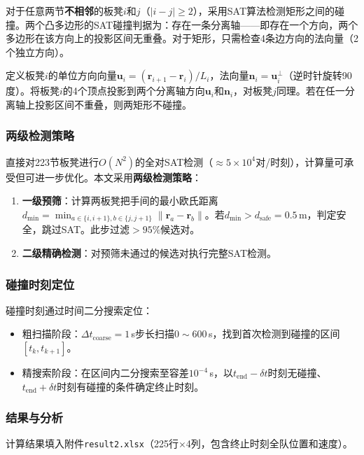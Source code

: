 \documentclass[12pt]{ctexart}
\begin{document}
对于任意两节\textbf{不相邻}的板凳$i$和$j$（$|i-j|\ge 2$），采用SAT算法检测矩形之间的碰撞。两个凸多边形的SAT碰撞判据为：存在一条分离轴——即存在一个方向，两个多边形在该方向上的投影区间无重叠。对于矩形，只需检查4条边方向的法向量（2个独立方向）。

定义板凳$i$的单位方向向量$\bm{u}_i = (\bm{r}_{i+1}-\bm{r}_i)/L_i$，法向量$\bm{n}_i = \bm{u}_i^\perp$（逆时针旋转90度）。将板凳$i$的4个顶点投影到两个分离轴方向$\bm{u}_i$和$\bm{n}_i$，对板凳$j$同理。若在任一分离轴上投影区间不重叠，则两矩形不碰撞。

\subsubsection{两级检测策略}

直接对223节板凳进行$O(N^2)$的全对SAT检测（$\approx 5\times 10^4$对/时刻），计算量可承受但可进一步优化。本文采用\textbf{两级检测策略}：

\begin{enumerate}[label=(\arabic*)]
  \item \textbf{一级预筛}：计算两板凳把手间的最小欧氏距离$d_{\min} = \min_{a\in\{i,i+1\},b\in\{j,j+1\}} \|\bm{r}_a-\bm{r}_b\|$。若$d_{\min} > d_{\text{safe}}=0.5$\,m，判定安全，跳过SAT。此步过滤$>95\%$候选对。
  \item \textbf{二级精确检测}：对预筛未通过的候选对执行完整SAT检测。
\end{enumerate}

\subsubsection{碰撞时刻定位}

碰撞时刻通过时间二分搜索定位：
\begin{itemize}
  \item 粗扫描阶段：$\Delta t_{\text{coarse}}=1$\,s步长扫描$0\sim 600$\,s，找到首次检测到碰撞的区间$[t_k,t_{k+1}]$。
  \item 精搜索阶段：在区间内二分搜索至容差$10^{-4}$\,s，以$t_{\text{end}}-\delta t$时刻无碰撞、$t_{\text{end}}+\delta t$时刻有碰撞的条件确定终止时刻。
\end{itemize}

\subsubsection{结果与分析}

计算结果填入附件\texttt{result2.xlsx}（225行$\times$4列，包含终止时刻全队位置和速度）。
\end{document}
